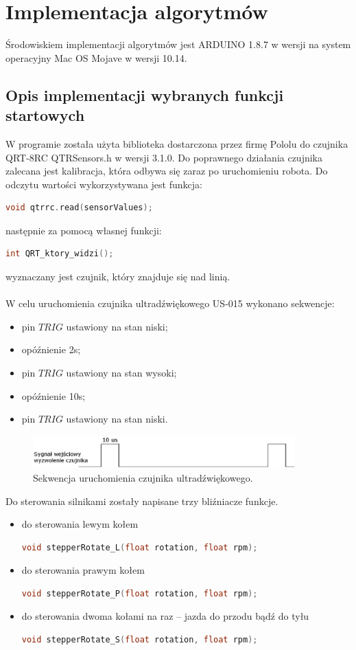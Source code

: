 \chapter{Implementacja algorytmów}
Środowiskiem implementacji algorytmów jest ARDUINO 1.8.7 w wersji na system operacyjny Mac OS Mojave w wersji 10.14.
\section{Opis implementacji wybranych funkcji startowych}
W programie została użyta biblioteka dostarczona przez firmę Pololu do czujnika QRT-8RC QTRSensors.h w wersji 3.1.0.\cite{QRT} Do poprawnego działania czujnika zalecana jest kalibracja, która odbywa się zaraz po uruchomieniu robota.
Do odczytu wartości wykorzystywana jest funkcja:
\begin{lstlisting}[language=C]
    void qtrrc.read(sensorValues);
\end{lstlisting}
następnie za pomocą własnej funkcji:
\begin{lstlisting}[language=C]
    int QRT_ktory_widzi();
\end{lstlisting}
wyznaczany jest czujnik, który znajduje się nad linią.
\\
\\
W celu uruchomienia czujnika ultradźwiękowego US-015  wykonano sekwencje:
\begin{itemize}
    \item pin $TRIG$ ustawiony na stan niski;
    \item opóźnienie 2\si{\micro}s;
    \item pin $TRIG$ ustawiony na stan wysoki;
    \item opóźnienie 10\si{\micro}s;
    \item pin $TRIG$ ustawiony na stan niski.
\end{itemize}
\begin{figure}[H]
\centering
\includegraphics[width=0.9\textwidth]{inzynierku/img/sekwencja}
\caption{\label{fig:sekwencja}Sekwencja uruchomienia czujnika ultradźwiękowego.}
\end{figure}
Do sterowania silnikami zostały napisane trzy bliźniacze funkcje.
\begin{itemize}
    \item do sterowania lewym kołem
    \begin{lstlisting}[language=C]
    void stepperRotate_L(float rotation, float rpm);
    \end{lstlisting}
    \item do sterowania prawym kołem
    \begin{lstlisting}[language=C]
    void stepperRotate_P(float rotation, float rpm);
    \end{lstlisting}
    \item do sterowania dwoma kołami na raz -- jazda do przodu bądź do tyłu
    \begin{lstlisting}[language=C]
    void stepperRotate_S(float rotation, float rpm);
    \end{lstlisting}
\end{itemize}
